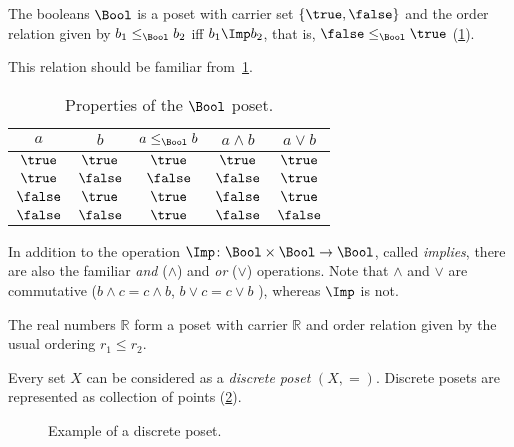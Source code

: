 \begin{example}[Booleans]\label{ex:bool}
The booleans $\Bool$ is a poset with carrier set $\{\true,\false\}$ and the order relation given by $b_1 \leq_\Bool b_2$ iff $b_1 \Imp b_2$, that is, $\false \leq_\Bool \true$ (\cref{fig:boolean}).

\begin{figure}[h!]
   \centering
   \caption{\label{fig:boolean}}
\end{figure}

\noindent This relation should be familiar from~\cref{tab:boolposet}.
\begin{table}[h!]
\begin{center}
\begin{tabular}{cc|ccc}
$a$ & $b$ & $a \leq_\Bool b$ & $a \wedge b$ & $a \vee b$ \\ \hline
$\true$&$\true$&$\true$&$\true$&$\true$\\
$\true$&$\false$&$\false$&$\false$&$\true$\\
$\false$&$\true$&$\true$&$\false$&$\true$\\
$\false$&$\false$&$\true$&$\false$&$\false$
\end{tabular}
\end{center}
\caption{Properties of the $\Bool$ poset. \label{tab:boolposet}}
\end{table}
In addition to the operation $\Imp\colon\Bool\times \Bool\to\Bool$, called \emph{implies}, there are also the familiar \emph{and} ($\wedge$) and \emph{or} ($\vee$) operations. Note that $\wedge$ and $\vee$ are commutative ($b\wedge c = c\wedge b$, $b\vee c = c\vee b$ ), whereas $\Imp$ is not.
\end{example}




\begin{example}[Reals]
The real numbers $\mathbb{R}$ form a poset with carrier $\mathbb{R}$ and order relation given by the usual ordering $r_1 \leq r_2$.
\end{example}


\begin{example}
\label{ex:discreteposet}
Every set $X$ can be considered as a \emph{discrete poset} $(X,=)$. Discrete posets are represented as collection of points (\cref{fig:discretepos}).

\begin{figure}[tbh]
   \centering
   \caption{Example of a discrete poset. \label{fig:discretepos}}
\end{figure}
\end{example}

